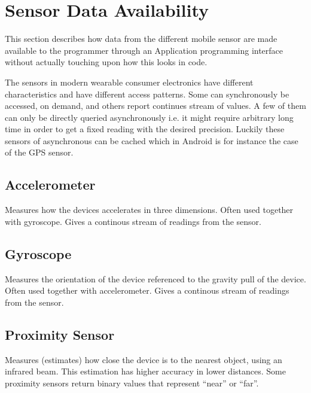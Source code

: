 
\section{Sensor Data Availability}
\label{sec:sensor_data_availability}

This section describes how data from the different mobile sensor are made available to the programmer through an Application programming interface without actually touching upon how this looks in code. 

The sensors in modern wearable consumer electronics have different characteristics and have different access patterns. Some can synchronously be accessed, on demand, and others report continues stream of values. A few of them can only be directly queried asynchronously i.e. it might require arbitrary long time in order to get a fixed reading with the desired precision. Luckily these sensors of asynchronous can be cached which in Android is for instance the case of the GPS sensor.   



\subsection{Accelerometer}
\label{sub:accelerometer}
Measures how the devices accelerates in three dimensions. Often used together with gyroscope. Gives a continous stream of readings from the sensor.

\subsection{Gyroscope}
\label{sub:gyroscope}
Measures the orientation of the device referenced to the gravity pull of the device. Often used together with accelerometer. Gives a continous stream of readings from the sensor.

\subsection{Proximity Sensor}
\label{sub:proximity_sensor}
Measures (estimates) how close the device is to the nearest object, using an infrared beam. This estimation has higher accuracy in lower distances. Some proximity sensors return binary values that represent ``near'' or ``far''.

